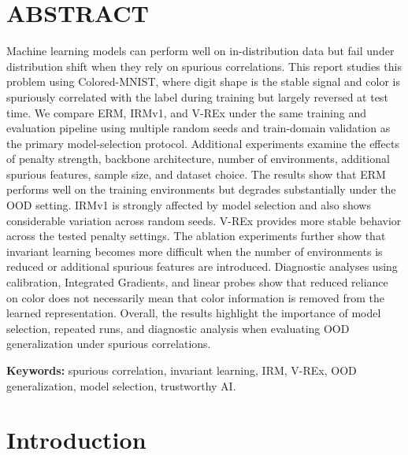 \documentclass[12pt,a4paper]{article}
\begin{document}
\pagestyle{plain}
\section*{ABSTRACT}
\noindent
Machine learning models can perform well on in-distribution data but fail under 
distribution shift when they rely on spurious correlations. This report studies 
this problem using Colored-MNIST, where digit shape is the stable signal and color 
is spuriously correlated with the label during training but largely reversed at test 
time. We compare ERM, IRMv1, and V-REx under the same training and evaluation 
pipeline using multiple random seeds and train-domain validation as the primary 
model-selection protocol. Additional experiments examine the effects of penalty 
strength, backbone architecture, number of environments, additional spurious features, 
sample size, and dataset choice. The results show that ERM performs well on the training 
environments but degrades substantially under the OOD setting. IRMv1 is strongly 
affected by model selection and also shows considerable variation across random seeds. 
V-REx provides more stable behavior across the tested penalty settings. 
The ablation experiments further show that invariant learning becomes more 
difficult when the number of environments is reduced or additional spurious 
features are introduced. Diagnostic analyses using calibration, Integrated Gradients, 
and linear probes show that reduced reliance on color does not necessarily mean 
that color information is removed from the learned representation. 
Overall, the results highlight the importance of model selection, repeated runs, 
and diagnostic analysis when evaluating OOD generalization under spurious correlations.

\medskip
\noindent\textbf{Keywords:} spurious correlation, invariant learning, IRM, 
V-REx, OOD generalization, model selection, trustworthy AI.
\clearpage

\begingroup
\small
\tableofcontents
\endgroup
\clearpage
\listoffigures
\clearpage
\listoftables

\clearpage
{}
\pagestyle{report}
\section{Introduction}\label{sec:intro}
\end{document}
